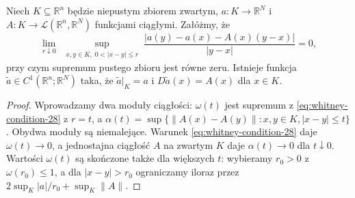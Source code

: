 \begin{lemat}
\label{lem:whitney-c1-28}
Niech $K\subseteq\mathbb R^n$ będzie niepustym zbiorem zwartym,
$a:K\to\mathbb R^N$ i
$A:K\to\mathcal L(\mathbb R^n,\mathbb R^N)$ funkcjami ciągłymi.
Załóżmy, że
\begin{equation}\label{eq:whitney-condition-28}
 \lim_{r\downarrow0}\ \sup_{\substack{x,y\in K,\;0<|x-y|\le r}}
 \frac{|a(y)-a(x)-A(x)(y-x)|}{|y-x|}=0,
\end{equation}
przy czym supremum pustego zbioru jest równe zeru.
Istnieje funkcja $\widetilde a\in C^1(\mathbb R^n;\mathbb R^N)$
taka, że $\widetilde a|_K=a$ i
$D\widetilde a(x)=A(x)$ dla $x\in K$.
\end{lemat}
\begin{proof}
Wprowadzamy dwa moduły ciągłości: $\omega(t)$ jest
supremum z \eqref{eq:whitney-condition-28} z $r=t$,
a $\alpha(t)=\sup\{\|A(x)-A(y)\|:x,y\in K,
|x-y|\le t\}$. Obydwa moduły są niemalejące. Warunek
\eqref{eq:whitney-condition-28} daje
$\omega(t)\to0$, a jednostajna ciągłość $A$
na zwartym $K$ daje $\alpha(t)\to0$ dla $t\downarrow0$.
Wartości $\omega(t)$ są skończone także dla większych $t$:
wybieramy $r_0>0$ z $\omega(r_0)\le1$,
a dla $|x-y|>r_0$ ograniczamy iloraz przez
$2\sup_K|a|/r_0+\sup_K\|A\|$.


\end{proof}
